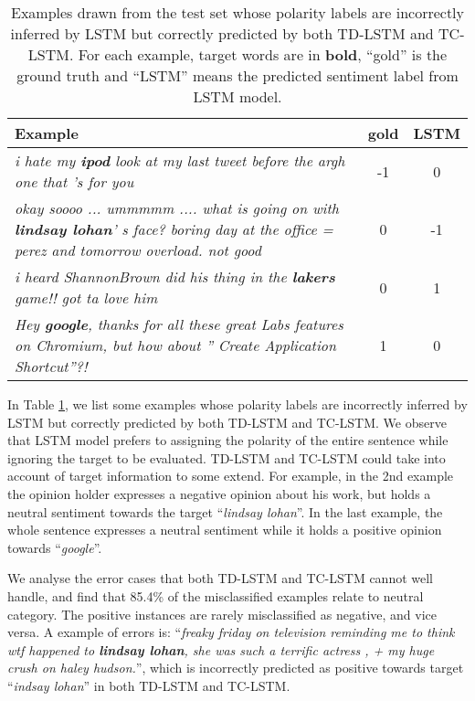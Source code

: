 \documentclass[11pt]{article}
\begin{document}
\begin{table}[h]
	\centering
	\begin{tabular}{p{12cm}|c|c}
		\hline
		Example & gold  &  LSTM \\
		\hline
		\textit{i hate my \textbf{ipod} look at my last tweet before the argh one that 's for you}	& 	-1	&	0	 \\
		\hline
		\textit{okay soooo ... ummmmm .... what is going on with \textbf{lindsay lohan}' s face? boring day at the office = perez and tomorrow overload. not good} & 0 & -1 \\
		\hline
		\textit{i heard ShannonBrown did his thing in the \textbf{lakers} game!! got ta love him} & 0 & 1 \\
		\hline
\textit{Hey \textbf{google}, thanks for all these great Labs features on Chromium, but how about '' Create Application Shortcut''?!} & 1 & 0 \\
\hline
	\end{tabular}
	\caption{Examples drawn from the test set whose polarity labels are incorrectly inferred by LSTM but correctly predicted by both TD-LSTM and TC-LSTM. For each example, target words are in \textbf{bold}, ``gold'' is the ground truth and ``LSTM'' means the predicted sentiment label from LSTM model.}
	\label{table:case}
\end{table}

In Table \ref{table:case}, we list some examples whose polarity labels are incorrectly inferred by LSTM but correctly predicted by both TD-LSTM and TC-LSTM.
We observe that LSTM model prefers to assigning the polarity of the entire sentence while ignoring the target to be evaluated.
TD-LSTM and TC-LSTM could take into account of target information to some extend. 
For example, in the 2nd example the opinion holder expresses a negative opinion about his work, but holds a neutral sentiment towards the target ``\textit{lindsay lohan}''.
In the last example, the whole sentence expresses a neutral sentiment while it holds a positive opinion towards ``\textit{google}''.

We analyse the error cases that both TD-LSTM and TC-LSTM cannot well handle, and find that 85.4\% of the misclassified examples relate to neutral category. The positive instances are rarely misclassified as negative, and vice versa. 
A example of errors is: ``\textit{freaky friday on television reminding me to think wtf happened to \textbf{lindsay lohan}, she was such a terrific actress , + my huge crush on haley hudson.}'', which is incorrectly predicted as positive towards target ``\textit{indsay lohan}'' in both TD-LSTM and TC-LSTM.
\end{document}
